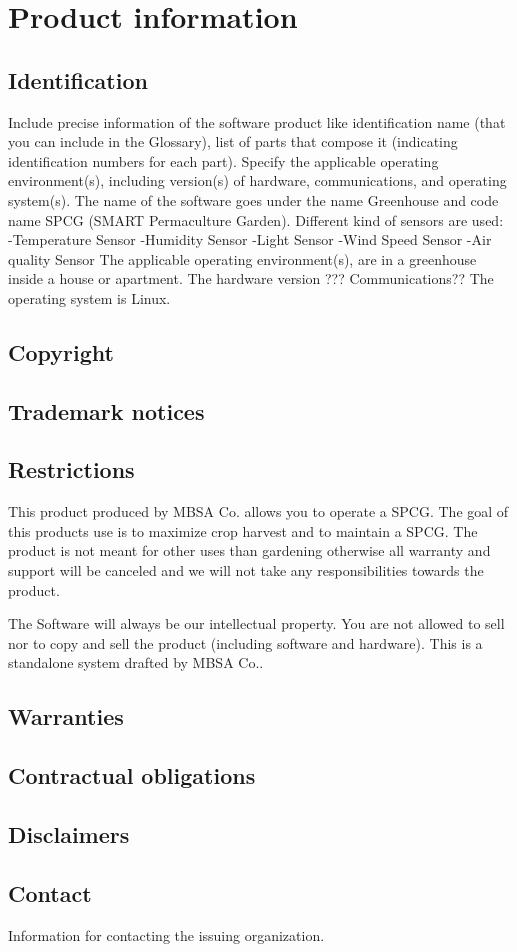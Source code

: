 \chapter{Product information}
\vspace{-6em}


\section{Identification}
Include precise information of the software product like identification name (that you can include in the \gls{Glossary}), list of parts that compose it (indicating identification numbers for each part). 
Specify the applicable operating environment(s), including version(s) of hardware, communications, and operating system(s).
The name of the software goes under the name Greenhouse and code name SPCG (SMART Permaculture Garden). 
Different kind of sensors are used:
-Temperature Sensor 
-Humidity Sensor
-Light Sensor
-Wind Speed Sensor
-Air quality Sensor
The applicable operating environment(s), are in a greenhouse inside a house or apartment.
The hardware version ???
Communications??
The operating system is Linux.


\section{Copyright}

\section{Trademark notices}

\section{Restrictions}
This product produced by MBSA Co. allows you to operate a SPCG. The goal of this
products use is to maximize crop harvest and to maintain a SPCG. The product is
not meant for other uses than gardening otherwise all warranty and support will
be canceled and we will not take any responsibilities towards the product.

The Software will always be our intellectual property. You are not allowed to sell nor to copy and sell the product (including software and hardware). This is a standalone system drafted by MBSA Co..

\section{Warranties}

\section{Contractual obligations}

\section{Disclaimers}

\section{Contact}
Information for contacting the issuing organization.